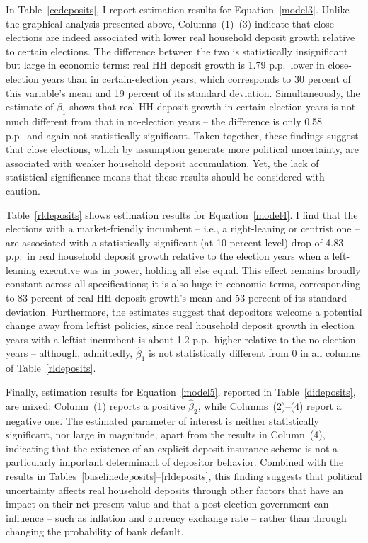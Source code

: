 \documentclass[12pt,a4paper]{article}
\begin{document}
In Table~\ref{cedeposits}, I report estimation results for Equation~\ref{model3}. Unlike the graphical analysis presented above, Columns~(1)--(3) indicate that close elections are indeed associated with lower real household deposit growth relative to certain elections. The difference between the two is statistically insignificant but large in economic terms: real HH deposit growth is 1.79 p.p.\ lower in close-election years than in certain-election years, which corresponds to 30 percent of this variable's mean and 19 percent of its standard deviation. Simultaneously, the estimate of $\beta_1$ shows that real HH deposit growth in certain-election years is not much different from that in no-election years -- the difference is only 0.58 p.p.\ and again not statistically significant. Taken together, these findings suggest that close elections, which by assumption generate more political uncertainty, are associated with weaker household deposit accumulation. Yet, the lack of statistical significance means that these results should be considered with caution.


Table~\ref{rldeposits} shows estimation results for Equation~\ref{model4}. I find that the elections with a market-friendly incumbent -- i.e., a right-leaning or centrist one -- are associated with a statistically significant (at 10 percent level) drop of 4.83 p.p.\ in real household deposit growth relative to the election years when a left-leaning executive was in power, holding all else equal. This effect remains broadly constant across all specifications; it is also huge in economic terms, corresponding to 83 percent of real HH deposit growth's mean and 53 percent of its standard deviation. Furthermore, the estimates suggest that depositors welcome a potential change away from leftist policies, since real household deposit growth in election years with a leftist incumbent is about 1.2 p.p.\ higher relative to the no-election years -- although, admittedly, $\hat{\beta}_1$ is not statistically different from 0 in all columns of Table~\ref{rldeposits}.

Finally, estimation results for Equation~\eqref{model5}, reported in Table~\ref{dideposits}, are mixed: Column~(1) reports a positive $\hat{\beta}_2$, while Columns~(2)--(4) report a negative one. The estimated parameter of interest is neither statistically significant, nor large in magnitude, apart from the results in Column~(4), indicating that the existence of an explicit deposit insurance scheme is not a particularly important determinant of depositor behavior. Combined with the results in Tables~\ref{baselinedeposits}--\ref{rldeposits}, this finding suggests that political uncertainty affects real household deposits through other factors that have an impact on their net present value and that a post-election government can influence -- such as inflation and currency exchange rate -- rather than through changing the probability of bank default.
\end{document}
